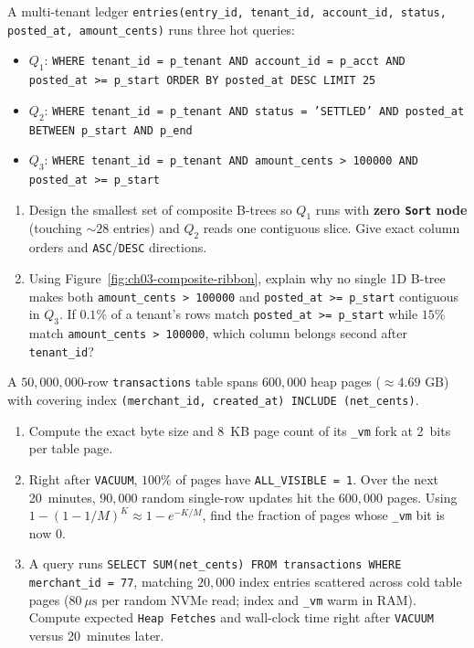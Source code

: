 \begin{exercise}
\label{exer:ch03-composite-design}
A multi-tenant ledger \texttt{entries(entry\_id, tenant\_id, account\_id, status, posted\_at, amount\_cents)} runs three hot queries:
\begin{itemize}
  \item $Q_1$: \texttt{WHERE tenant\_id = p\_tenant AND account\_id = p\_acct AND posted\_at >= p\_start ORDER BY posted\_at DESC LIMIT 25}
  \item $Q_2$: \texttt{WHERE tenant\_id = p\_tenant AND status = 'SETTLED' AND posted\_at BETWEEN p\_start AND p\_end}
  \item $Q_3$: \texttt{WHERE tenant\_id = p\_tenant AND amount\_cents > 100000 AND posted\_at >= p\_start}
\end{itemize}
\begin{enumerate}
  \item Design the smallest set of composite B-trees so $Q_1$ runs with \textbf{zero \texttt{Sort} node} (touching $\sim 28$ entries) and $Q_2$ reads one contiguous slice. Give exact column orders and \texttt{ASC}/\texttt{DESC} directions.
  \item Using Figure~\ref{fig:ch03-composite-ribbon}, explain why no single 1D B-tree makes both \texttt{amount\_cents > 100000} and \texttt{posted\_at >= p\_start} contiguous in $Q_3$. If $0.1\%$ of a tenant's rows match \texttt{posted\_at >= p\_start} while $15\%$ match \texttt{amount\_cents > 100000}, which column belongs second after \texttt{tenant\_id}?
\end{enumerate}
\end{exercise}

\begin{exercise}
\label{exer:ch03-vm-math}
A $50{,}000{,}000$-row \texttt{transactions} table spans $600{,}000$ heap pages ($\approx 4.69\text{ GB}$) with covering index \texttt{(merchant\_id, created\_at) INCLUDE (net\_cents)}.
\begin{enumerate}
  \item Compute the exact byte size and 8~KB page count of its \texttt{\_vm} fork at 2~bits per table page.
  \item Right after \texttt{VACUUM}, $100\%$ of pages have \texttt{ALL\_VISIBLE = 1}. Over the next 20~minutes, $90{,}000$ random single-row updates hit the $600{,}000$ pages. Using $1 - (1 - 1/M)^K \approx 1 - e^{-K/M}$, find the fraction of pages whose \texttt{\_vm} bit is now $0$.
  \item A query runs \texttt{SELECT SUM(net\_cents) FROM transactions WHERE merchant\_id = 77}, matching $20{,}000$ index entries scattered across cold table pages ($80~\mu\text{s}$ per random NVMe read; index and \texttt{\_vm} warm in RAM). Compute expected \texttt{Heap Fetches} and wall-clock time right after \texttt{VACUUM} versus 20~minutes later.
\end{enumerate}
\end{exercise}

